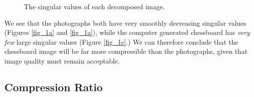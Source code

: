 \documentclass[a4paper,10pt,english]{article}
\begin{document}
\begin{multicols*}{2}
\begin{figure}[H]
 \centering
    \qquad
   	\qquad
    \caption{The singular values of each decomposed image.\label{fig_1}}
\end{figure}

We see that the photographs both have very smoothly decreasing singular values (Figures \ref{fig_1a} and \ref{fig_1a}), while the computer generated chessboard has \textit{very few} large singular values (Figure \ref{fig_1c}.)  We can therefore conclude that the chessboard image will be far more compressible than the photographs, given that image quality must remain acceptable.

\subsection*{Compression Ratio}


\end{multicols*}
\end{document}
